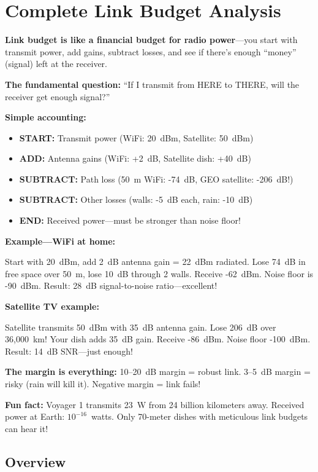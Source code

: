 \chapter{Complete Link Budget Analysis}
\label{ch:linkbudget}

\begin{nontechnical}
\textbf{Link budget is like a financial budget for radio power}---you start with transmit power, add gains, subtract losses, and see if there's enough ``money'' (signal) left at the receiver.

\textbf{The fundamental question:} ``If I transmit from HERE to THERE, will the receiver get enough signal?''

\textbf{Simple accounting:}
\begin{itemize}
\item \textbf{START:} Transmit power (WiFi: 20~dBm, Satellite: 50~dBm)
\item \textbf{ADD:} Antenna gains (WiFi: +2~dB, Satellite dish: +40~dB)
\item \textbf{SUBTRACT:} Path loss (50~m WiFi: -74~dB, GEO satellite: -206~dB!)
\item \textbf{SUBTRACT:} Other losses (walls: -5~dB each, rain: -10~dB)
\item \textbf{END:} Received power---must be stronger than noise floor!
\end{itemize}

\textbf{Example---WiFi at home:}

Start with 20~dBm, add 2~dB antenna gain = 22~dBm radiated. Lose 74~dB in free space over 50~m, lose 10~dB through 2 walls. Receive -62~dBm. Noise floor is -90~dBm. Result: 28~dB signal-to-noise ratio---excellent!

\textbf{Satellite TV example:}

Satellite transmits 50~dBm with 35~dB antenna gain. Lose 206~dB over 36,000~km! Your dish adds 35~dB gain. Receive -86~dBm. Noise floor -100~dBm. Result: 14~dB SNR---just enough!

\textbf{The margin is everything:} 10--20~dB margin = robust link. 3--5~dB margin = risky (rain will kill it). Negative margin = link fails!

\textbf{Fun fact:} Voyager 1 transmits 23~W from 24 billion kilometers away. Received power at Earth: $10^{-16}$~watts. Only 70-meter dishes with meticulous link budgets can hear it!
\end{nontechnical}

\section{Overview}

